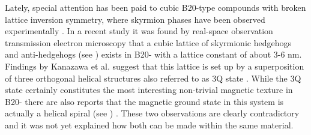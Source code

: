 \documentclass [a4paper, 12pt]{article}
\begin{document}
Lately, special attention has been paid to cubic B20-type compounds with broken lattice inversion symmetry,
where skyrmion phases have been observed experimentally \cite{nagaosa_topological_2013}.
In a recent study \cite{tanigaki_real-space_2015} it was 
found by real-space observation transmission electron microscopy that a cubic lattice of skyrmionic hedgehogs
and anti-hedgehogs (see ) exists in B20- 
with a lattice constant of about 3-6 nm.
Findings by Kanazawa et al. suggest that this lattice is set up by a superposition of three orthogonal
helical structures also referred to as 3Q state \cite{kanazawa_noncentrosymmetric_2017}. 
While the 3Q state certainly constitutes the most interesting non-trivial magnetic texture 
in B20- there are also reports that the magnetic ground state in this system is
actually a helical spiral (see ) \cite{yaouanc_magnetic_2017}.
These two observations are clearly contradictory and it was not yet explained how
both can be made within the same material.\\
\end{document}
